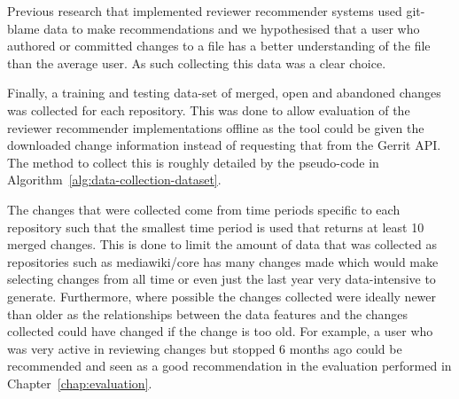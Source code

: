 Previous research that implemented reviewer recommender systems used git-blame data to make recommendations and we hypothesised that a user who authored or committed changes to a file has a better understanding of the file than the average user. As such collecting this data was a clear choice.

Finally, a training and testing data-set of merged, open and abandoned changes was collected for each repository. This was done to allow evaluation of the reviewer recommender implementations offline as the tool could be given the downloaded change information instead of requesting that from the Gerrit API. The method to collect this is roughly detailed by the pseudo-code in Algorithm~\ref{alg:data-collection-dataset}.

\begin{algorithm}[H]
	\caption%
	{\label{alg:data-collection-dataset}Data collection of the testing and training data set.}
\end{algorithm}

\label{para:limited-to-ten-merged-changes}The changes that were collected come from time periods specific to each repository such that the smallest time period is used that returns at least 10 merged changes. This is done to limit the amount of data that was collected as repositories such as mediawiki/core has many changes made which would make selecting changes from all time or even just the last year very data-intensive to generate. Furthermore, where possible the changes collected were ideally newer than older as the relationships between the data features and the changes collected could have changed if the change is too old. For example, a user who was very active in reviewing changes but stopped 6 months ago could be recommended and seen as a good recommendation in the evaluation performed in Chapter~\ref{chap:evaluation}.

